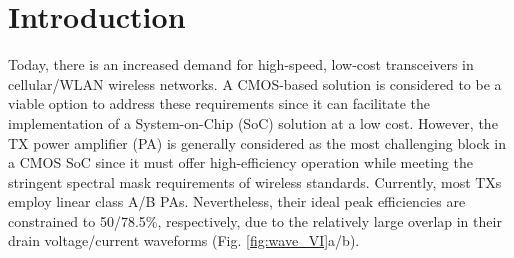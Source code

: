 \documentclass[conference]{IEEEtran}
\begin{document}
\section{Introduction}
Today, there is an increased demand for high-speed, low-cost transceivers in cellular/WLAN wireless networks. A CMOS-based solution is considered to be a viable option to address these requirements since it can facilitate the implementation of a System-on-Chip (SoC) solution at a low cost. However, the TX power amplifier (PA) is generally considered as the most challenging block in a CMOS SoC since it must offer high-efficiency operation while meeting the stringent spectral mask requirements of wireless standards. Currently, most TXs employ linear class A/B PAs. Nevertheless, their ideal  peak efficiencies are constrained to 50/78.5\%, respectively, due to the relatively large overlap in their drain voltage/current  waveforms (Fig. \ref{fig:wave_VI}a/b).
\end{document}
